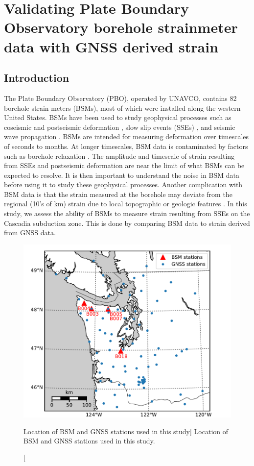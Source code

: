 \chapter{Validating Plate Boundary Observatory borehole
strainmeter data with GNSS derived strain}

\section{Introduction}
The Plate Boundary Observatory (PBO), operated by UNAVCO, contains 82
borehole strain meters (BSMs), most of which were installed along the
western United States. BSMs have been used to study geophysical
processes such as coseismic and postseismic deformation
\citep[e.g.,][]{Langbein2006, Langbein2015}, slow slip events (SSEs)
\citep[e.g.,][]{Dragert2011}, and seismic wave propagation
\citep{Barbour2017}. BSMs are intended for measuring deformation over
timescales of seconds to months. At longer timescales, BSM data is
contaminated by factors such as borehole relaxation
\citep{Gladwin1987}. The amplitude and timescale of strain resulting
from SSEs and postseismic deformation are near the limit of what BSMs
can be expected to resolve. It is then important to understand the
noise in BSM data before using it to study these geophysical
processes. Another complication with BSM data is that the strain
measured at the borehole may deviate from the regional (10's of km)
strain due to local topographic or geologic features
\citep{Berger1976}. In this study, we assess the ability of BSMs to
measure strain resulting from SSEs on the Cascadia subduction zone.
This is done by comparing BSM data to strain derived from GNSS data.

\begin{figure}
\includegraphics{ch6/figures/map.pdf}
\caption
[Location of BSM and GNSS stations used in this study]
{Location of BSM and GNSS stations used in this study.}   
\label{ch6:fig:Map}
\end{figure}

